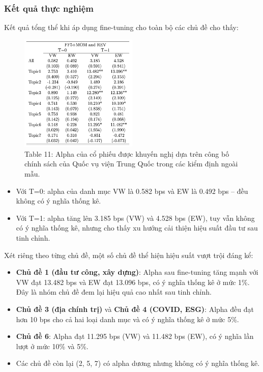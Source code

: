 \documentclass[a4paper,12pt]{article}
\begin{document}
\subsubsection{Kết quả thực nghiệm}
Kết quả tổng thể khi áp dụng fine-tuning cho toàn bộ các chủ đề cho thấy:
\begin{figure}[H]
    \centering
    \includegraphics[width=0.5\textwidth]{table/tab11.png}
    \caption*{Table 11: Alpha của cổ phiếu được khuyến nghị dựa trên công bố chính sách của Quốc vụ viện Trung Quốc trong các kiểm định ngoài mẫu.}
    \label{fig:fig2}
\end{figure}
\begin{itemize}
    \item Với T=0: alpha của danh mục VW là 0.582 bps và EW là 0.492 bps – đều không có ý nghĩa thống kê.
    \item Với T=1: alpha tăng lên 3.185 bps (VW) và 4.528 bps (EW), tuy vẫn không có ý nghĩa thống kê, nhưng cho thấy xu hướng cải thiện hiệu suất đầu tư sau tinh chỉnh.
\end{itemize}

Xét riêng theo từng chủ đề, một số chủ đề thể hiện hiệu suất vượt trội đáng kể:

\begin{itemize}
    \item \textbf{Chủ đề 1 (đầu tư công, xây dựng)}: Alpha sau fine-tuning tăng mạnh với VW đạt 13.482 bps và EW đạt 13.096 bps, có ý nghĩa thống kê ở mức 1\%. Đây là nhóm chủ đề đem lại hiệu quả cao nhất sau tinh chỉnh.
    \item \textbf{Chủ đề 3 (địa chính trị)} và \textbf{Chủ đề 4 (COVID, ESG)}: Alpha đều đạt hơn 10 bps cho cả hai loại danh mục và có ý nghĩa thống kê ở mức 5\%.
    \item \textbf{Chủ đề 6}: Alpha đạt 11.295 bps (VW) và 11.482 bps (EW), có ý nghĩa lần lượt ở mức 10\% và 5\%.
    \item Các chủ đề còn lại (2, 5, 7) có alpha dương nhưng không có ý nghĩa thống kê.
\end{itemize}
\end{document}
